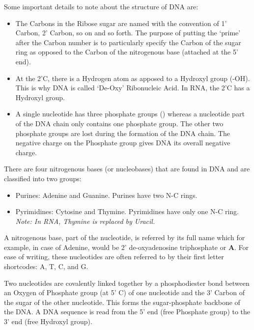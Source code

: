 \documentclass[letterpaper,12pt]{article}
\begin{document}
Some important details to note about the structure of DNA are:
\begin{itemize}
	\item The Carbons in the Ribose sugar are named with the convention of 1' Carbon, 2' Carbon, so on and so forth. The purpose of putting the `prime' after the Carbon number is to particularly specify the Carbon of the sugar ring as opposed to the Carbon of the nitrogenous base (attached at the 5' end).
	\item At the 2'C, there is a Hydrogen atom as apposed to a Hydroxyl group (-OH). This is why DNA is called `De-Oxy' Ribonucleic Acid. In RNA, the 2'C has a Hydroxyl group.
	\item A single nucleotide has three phosphate groups
	      () whereas a nucleotide part of the DNA chain only contains one phosphate group. The other two phosphate groups are lost during the formation of the DNA chain. The negative charge on the Phosphate group gives DNA its overall negative charge.
\end{itemize}

There are four nitrogenous bases (or nucleobases) that are found in DNA and are classified into two groups:
\begin{itemize}
	\item Purines: Adenine and Guanine. Purines have two N-C rings.
	\item Pyrimidines: Cytosine and Thymine. Pyrimidines have only one N-C ring. \textit{Note: In RNA, Thymine is replaced by Uracil.}
\end{itemize}

A nitrogenous base, part of the nucleotide, is referred by its full name which for example, in case of Adenine, would be 2' de-oxyadenosine triphosphate or \textbf{A}. For ease of writing, these nucleotides are often referred to by their first letter shortcodes: A, T, C, and G.

Two nucleotides are covalently linked together by a phosphodiester bond between an Oxygen of Phosphate group  (at 5' C) of one nucleotide and the 3' Carbon of the sugar of the other nucleotide. This forms the sugar-phosphate backbone of the DNA. A DNA sequence is read from the 5' end (free Phosphate group) to the 3' end (free Hydroxyl group).
\end{document}
